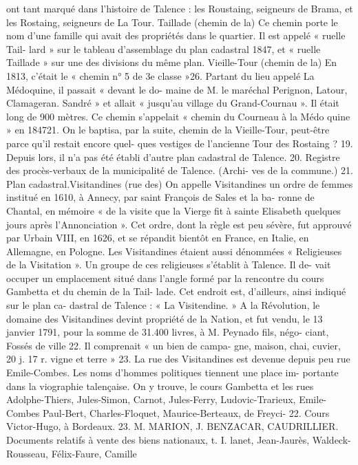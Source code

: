 \documentclass[a4paper,11pt]{book}
\begin{document}
ont tant marqué dans l'histoire de Talence : les Roustaing,
seigneurs de Brama, et les Rostaing, seigneurs de La
Tour.
Taillade (chemin de la)
Ce chemin porte le nom d'une famille qui avait des
propriétés dans le quartier. Il est appelé « ruelle Tail-
lard » sur le tableau d'assemblage du plan cadastral 1847,
et « ruelle Taillade » sur une des divisions du même plan.
Vieille-Tour (chemin de la)
En 1813, c'était le « chemin n° 5 de 3e classe »26. Partant
du lieu appelé La Médoquine, il passait « devant le do-
maine de M. le maréchal Perignon, Latour, Clamageran.
Sandré » et allait « jusqu'au village du Grand-Cournau ».
Il était long de 900 mètres.
Ce chemin s'appelait « chemin du Courneau à la Médo
quine » en 184721. On le baptisa, par la suite, chemin de
la Vieille-Tour, peut-être parce qu'il restait encore quel-
ques vestiges de l'ancienne Tour des Rostaing ?
19. Depuis lors, il n'a pas été établi d'autre plan cadastral de Talence.
20. Registre des procès-verbaux de la municipalité de Talence. (Archi-
ves de la commune.)
21. Plan cadastral.Visitandines (rue des)
On appelle Visitandines un ordre de femmes institué
en 1610, à Annecy, par saint François de Sales et la ba-
ronne de Chantal, en mémoire « de la visite que la Vierge
fit à sainte Elisabeth quelques jours après l'Annonciation ».
Cet ordre, dont la règle est peu sévère, fut approuvé par
Urbain VIII, en 1626, et se répandit bientôt en France, en
Italie, en Allemagne, en Pologne.
Les Visitandines étaient aussi dénommées « Religieuses
de la Visitation ».
Un groupe de ces religieuses s'établit à Talence. Il de-
vait occuper un emplacement situé dans l'angle formé par
la rencontre du cours Gambetta et du chemin de la Tail-
lade. Cet endroit est, d'ailleurs, ainsi indiqué sur le plan ca-
dastral de Talence : « La Visitendine. »
A la Révolution, le domaine des Visitandines devint
propriété de la Nation, et fut vendu, le 13 janvier 1791,
pour la somme de 31.400 livres, à M. Peynado fils, négo-
ciant, Fossés de ville 22. Il comprenait « un bien de campa-
gne, maison, chai, cuvier, 20 j. 17 r. vigne et terre » 23.
La rue des Visitandines est devenue depuis peu rue
Emile-Combes.
Les noms d'hommes politiques tiennent une place im-
portante dans la viographie talençaise. On y trouve, le
cours Gambetta et les rues Adolphe-Thiers, Jules-Simon,
Carnot, Jules-Ferry, Ludovic-Trarieux, Emile-Combes
Paul-Bert, Charles-Floquet, Maurice-Berteaux, de Freyci-
22. Cours Victor-Hugo, à Bordeaux.
23. M. MARION, J. BENZACAR, CAUDRILLIER. Documents relatifs à
vente des biens nationaux, t. I.
lanet, Jean-Jaurès, Waldeck-Rousseau, Félix-Faure, Camille
\end{document}
